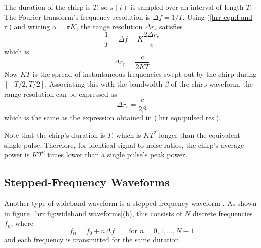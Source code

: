 The duration of the chirp is $T$, so $s(t)$ is sampled over an interval of
length $T$.  The Fourier transform's frequency resolution is $\Delta f=1/T$. 
Using (\ref{hrr eqn:f and r}) and writing $\alpha=\pi K$, the range 
resolution $\Delta r_r$ satisfies
\begin{equation}
\frac{1}{T}=\Delta f=K\frac{2\Delta r_r}{c}
\end{equation}
which is
\begin{equation}
\Delta r_r=\frac{c}{2KT}
\end{equation}
Now $KT$ is the spread of instantaneous frequencies swept out by the chirp
during $[-T/2,T/2]$.  Associating this with the bandwidth $\beta$ of the
chirp waveform, the range resolution can be expressed as
\begin{equation}\label{hrr eqn:chirp res}
\Delta r_r=\frac{c}{2\beta}
\end{equation}
which is the same as the expression obtained in (\ref{hrr eqn:pulsed res}).

Note that the chirp's duration is $T$, which is $KT^2$ longer than
the equivalent single pulse.  Therefore, for identical signal-to-noise
ratios, the chirp's average power is $KT^2$ times lower than a single 
pulse's peak power.

\subsection{Stepped-Frequency Waveforms}

Another type of wideband waveform is a stepped-frequency waveform
\cite{Weh87}.  As shown in figure~\ref{hrr fig:wideband waveforms}(b), this
consists of $N$ discrete frequencies $f_n$, where
\begin{equation}
f_n=f_0+n\Delta f\qquad\mbox{for $n=0,1,\ldots,N-1$}
\end{equation}
and each frequency is transmitted for the same duration. 

